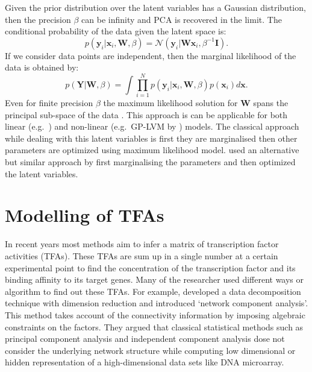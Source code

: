 Given the prior distribution over the latent variables has a Gaussian distribution, then the precision $\beta$ can be infinity and PCA is recovered in the limit. The conditional probability
of the data given the latent space is:
\begin{equation} \label{eq:cond_prob_latent_space}
p\left(\textbf{y}_i|\textbf{x}_i,\textbf{W},\beta \right) = \mathcal{N} \left(\textbf{y}_i|\textbf{W}\textbf{x}_i,\beta^{-1}\textbf{I}\right).
\end{equation}
If we consider data points are independent, then the marginal likelihood of the data is obtained by:
\begin{equation} \label{eq:marginal_likelihood_latent_space}
p\left(\textbf{Y}|\textbf{W},\beta \right) = 
\int \prod^{N}_{i=1} p\left(\textbf{y}_i|\textbf{x}_i,\textbf{W},\beta\right)p\left(\textbf{x}_i\right)d\textbf{x}.
\end{equation}
Even for finite precision $\beta$ the maximum likelihood solution for $\textbf{W}$ spans the principal sub-space of the data \cite{Tipping:1999}. This approach is can be applicable for both 
linear (e.g.\ \cite{Sanguinetti:2006}) and non-linear (e.g.\ GP-LVM by \cite{Lawrence:2005}) models. The classical approach while dealing with this latent variables is first they are marginalised then
other parameters are optimized using maximum likelihood model. \cite{Lawrence:2005} used an alternative but similar approach by first marginalising the parameters and then optimized the
latent variables.


\section{Modelling of TFAs}
% 
%
In recent years most methods aim to infer a matrix of transcription factor activities (TFAs). These TFAs are sum up in a single number at a certain experimental point to find the concentration of the transcription factor and its binding affinity to its target genes. Many of the researcher used different ways or algorithm to find out these TFAs. For example, \cite{Liao:2003} developed a data decomposition technique with dimension reduction and introduced ‘network component analysis’. This method takes account of the connectivity information by imposing algebraic constraints on the factors. They argued that classical statistical methods such as principal component analysis and independent component analysis dose not consider the underlying network structure while computing low dimensional or hidden representation of a high-dimensional data sets like DNA microarray. 


